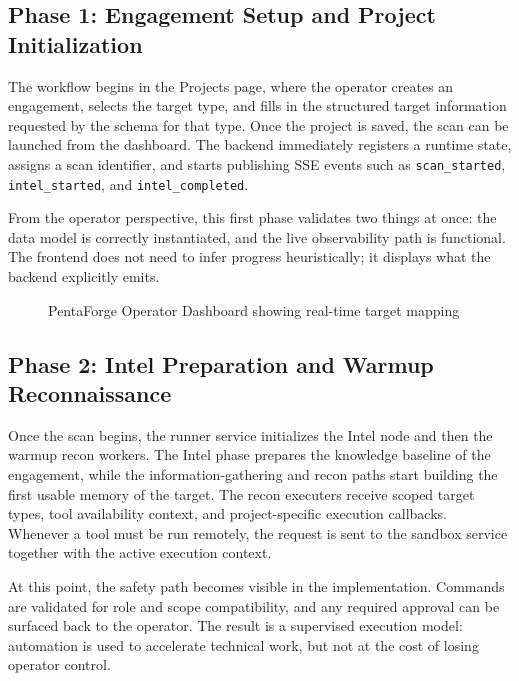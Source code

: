 \documentclass[12pt,a4paper]{report}
\begin{document}
\subsection{Phase 1: Engagement Setup and Project Initialization}

The workflow begins in the Projects page, where the operator creates an engagement,
selects the target type, and fills in the structured target information requested by
the schema for that type. Once the project is saved, the scan can be launched from
the dashboard. The backend immediately registers a runtime state, assigns a scan
identifier, and starts publishing SSE events such as \texttt{scan\_started},
\texttt{intel\_started}, and \texttt{intel\_completed}.

From the operator perspective, this first phase validates two things at once: the
data model is correctly instantiated, and the live observability path is functional.
The frontend does not need to infer progress heuristically; it displays what the
backend explicitly emits.

\begin{figure}[H]
    \centering
    \caption{PentaForge Operator Dashboard showing real-time target mapping}
    \label{fig:ui_dashboard}
\end{figure}

\subsection{Phase 2: Intel Preparation and Warmup Reconnaissance}

Once the scan begins, the runner service initializes the Intel node and then the
warmup recon workers. The Intel phase prepares the knowledge baseline of the
engagement, while the information-gathering and recon paths start building the first
usable memory of the target. The recon executers receive scoped target types, tool
availability context, and project-specific execution callbacks. Whenever a tool must
be run remotely, the request is sent to the sandbox service together with the active
execution context.

At this point, the safety path becomes visible in the implementation. Commands are
validated for role and scope compatibility, and any required approval can be surfaced
back to the operator. The result is a supervised execution model: automation is used
to accelerate technical work, but not at the cost of losing operator control.
\end{document}
